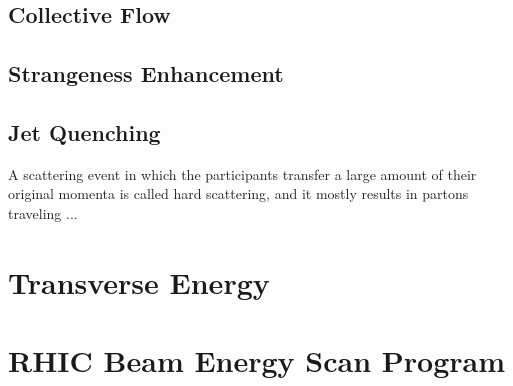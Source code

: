 \subsection{Collective Flow}
\subsection{Strangeness Enhancement}
\subsection{Jet Quenching}
A scattering event in which the participants transfer a large amount of their original momenta is called hard scattering, and it mostly results in partons traveling ...

\section{Transverse Energy}
\section{RHIC Beam Energy Scan Program}
